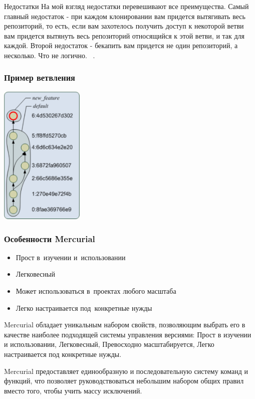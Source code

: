 \documentclass{../industrial-development}
\begin{document}
Недостатки
На мой взгляд недостатки перевешивают все преимущества. Самый главный недостаток - при каждом клонировании вам придется вытягивать весь репозиторий, то есть, если вам захотелось получить доступ к некоторой ветви вам придется вытянуть весь репозиторий относящийся к этой ветви, и так для каждой. Второй недостаток - бекапить вам придется не один репозиторий, а несколько. Что не логично. ~\cite{MercurialBrainIt}.

\begin{frame} \frametitle{Пример ветвления}
  \centerline{\includegraphics[width=0.3\textwidth]{branching-mercurial.pdf}}
\end{frame}

\begin{frame} \frametitle{Особенности Mercurial}
  
  \begin{itemize}
  \item Прост в~изучении и~использовании
  \item Легковесный
  \item Может использоваться в~проектах любого масштаба
  \item Легко настраивается под~конкретные нужды
  \end{itemize}
\end{frame}

\lecturenotes

Mercurial обладает уникальным набором свойств, позволяющим выбрать его в качестве наиболее подходящей системы управления версиями: Прост в изучении и использовании, Легковесный, Превосходно масштабируется, Легко настраивается под конкретные нужды.

Mercurial предоставляет единообразную и последовательную систему команд и функций, что позволяет руководствоваться небольшим набором общих правил вместо того, чтобы учить массу исключений.
\end{document}
